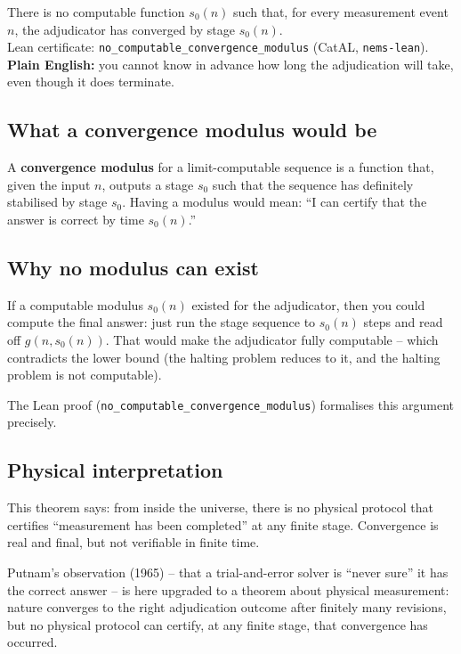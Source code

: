 \documentclass[11pt,a4paper]{article}
\newcommand{\term}[1]{\textbf{#1}}
\newcommand{\lean}[1]{\texttt{#1}}
\begin{document}
\begin{tcolorbox}[colback=boxorange,colframe=orange!60!black,
  title={The No-Modulus Theorem (P51, Theorem 6.4; Lean: CatAL)}]
There is no computable function $s_0(n)$ such that, for every measurement
event $n$, the adjudicator has converged by stage $s_0(n)$.\\[4pt]
Lean certificate: \lean{no\_computable\_convergence\_modulus} (CatAL,
\texttt{nems-lean}).\\[4pt]
\textbf{Plain English:} you cannot know in advance how long the adjudication
will take, even though it does terminate.
\end{tcolorbox}

\subsection{What a convergence modulus would be}

A \term{convergence modulus} for a limit-computable sequence is a function
that, given the input $n$, outputs a stage $s_0$ such that the sequence
has definitely stabilised by stage $s_0$.  Having a modulus would mean:
``I can certify that the answer is correct by time $s_0(n)$.''

\subsection{Why no modulus can exist}

If a computable modulus $s_0(n)$ existed for the adjudicator, then you could
compute the final answer: just run the stage sequence to $s_0(n)$ steps and
read off $g(n, s_0(n))$.  That would make the adjudicator fully computable
-- which contradicts the lower bound (the halting problem reduces to it,
and the halting problem is not computable).

The Lean proof (\lean{no\_computable\_convergence\_modulus}) formalises this
argument precisely.

\subsection{Physical interpretation}

This theorem says: from inside the universe, there is no physical protocol
that certifies ``measurement has been completed'' at any finite stage.
Convergence is real and final, but not verifiable in finite time.

Putnam's observation (1965) -- that a trial-and-error solver is ``never sure''
it has the correct answer -- is here upgraded to a theorem about physical
measurement: nature converges to the right adjudication outcome after finitely
many revisions, but no physical protocol can certify, at any finite stage,
that convergence has occurred.
\end{document}
